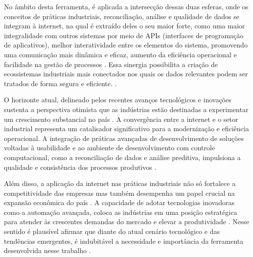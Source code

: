 No âmbito desta ferramenta, é aplicada a intersecção dessas duas esferas, onde os conceitos de práticas industriais, reconciliação, análise e qualidade de dados se integram à internet, na qual é extraído deles o seu maior forte, como uma maior integralidade com outros sistemas por meio de APIs (interfaces de programação de aplicativos), melhor interatividade entre os elementos do sistema, promovendo uma comunicação mais dinâmica e eficaz, aumento da eficiência operacional e facilidade na gestão de processos \cite{industry4}. Essa sinergia possibilita a criação de ecossistemas industriais mais conectados nos quais os dados relevantes podem ser tratados de forma segura e eficiente. \cite{industrybuild}.
    
O horizonte atual, delineado pelos recentes avanços tecnológicos e inovações sustenta a perspectiva otimista que as indústrias estão destinadas a experimentar um crescimento substancial no país \cite{industrychina}. A convergência entre a internet e o setor industrial representa um catalisador significativo para a modernização e eficiência operacional. A integração de práticas avançadas de desenvolvimento de soluções voltadas à usabilidade e ao ambiente de desenvolvimento com controle computacional, como a reconciliação de dados e análise preditiva, impulsiona a qualidade e consistência dos processos produtivos \cite{industrydigital}.
    
Além disso, a aplicação da internet nas práticas industriais não só fortalece a competitividade das empresas mas também desempenha um papel crucial na expansão econômica do país \cite{industryiot}. A capacidade de adotar tecnologias inovadoras como a automação avançada, coloca as indústrias em uma posição estratégica para atender às crescentes demandas do mercado e elevar a produtividade \cite{industryinternet}. Nesse sentido é plausível afirmar que diante do atual cenário tecnológico e das tendências emergentes, é indubitável a necessidade e importância da ferramenta desenvolvida nesse trabalho \cite{industrychina}.



